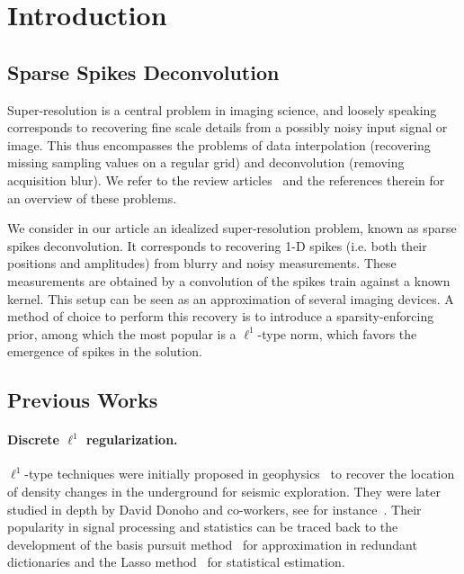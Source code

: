 
\section{Introduction}


\subsection{Sparse Spikes Deconvolution}

Super-resolution is a central problem in imaging science, and loosely speaking corresponds to recovering fine scale details from a possibly noisy input signal or image. This thus encompasses the problems of data interpolation (recovering missing sampling values on a regular grid) and deconvolution (removing acquisition blur). We refer to the review articles~\cite{Park-review,Lindberg-review} and the references therein for an overview of these problems. 

We consider in our article an idealized super-resolution problem, known as sparse spikes deconvolution. It corresponds to recovering 1-D spikes (i.e. both their positions and amplitudes) from blurry and noisy measurements. These measurements are obtained by a convolution of the spikes train against a known kernel. This setup can be seen as an approximation of several imaging devices. A method of choice to perform this recovery is to introduce a sparsity-enforcing prior, among which the most popular is a $\ell^1$-type norm, which favors the emergence of spikes in the solution. 



\subsection{Previous Works}


\paragraph{Discrete $\ell^1$ regularization. }


$\ell^1$-type techniques were initially proposed in geophysics~\cite{Claerbout-geophysics,santosa1986linear,Levy-Fullagar-81} to recover the location of density changes in the underground for seismic exploration. They were later studied in depth by David Donoho and co-workers, see for instance~\cite{Donoho-superresol-sparse}. Their popularity in signal processing and statistics can be traced back to the development of the basis pursuit method~\cite{chen1999atomi} for approximation in redundant dictionaries and the Lasso method~\cite{tibshirani1996regre} for statistical estimation. 

